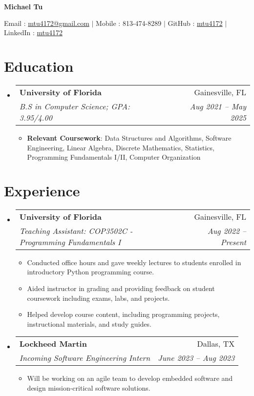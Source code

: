 \documentclass[letterpaper,11pt]{article}
\makeatletter
\newcommand{\resumeItem}[2]{
  \item\small{
    \textbf{#1}{: #2 \vspace{-2pt}}
  }
}
\newcommand{\resumeItemExperience}[1]{
  \item\small{
    {#1 \vspace{-2pt}}
  }
}
\newcommand{\resumeSubheading}[4]{
  \vspace{-1pt}\item
    \begin{tabular*}{0.97\textwidth}{l@{\extracolsep{\fill}}r}
      \textbf{#1} & #2 \\
      \textit{\small#3} & \textit{\small #4} \\
    \end{tabular*}\vspace{-6pt}
}
\newcommand{\resumeSubHeadingListStart}{\begin{itemize}[leftmargin=*, label={}]}
\newcommand{\resumeSubHeadingListEnd}{\end{itemize}}
\newcommand{\resumeItemListStart}{\begin{itemize}}
\newcommand{\resumeItemListEnd}{\end{itemize}\vspace{-5pt}}
\makeatother
\begin{document}
    \centerline{\textbf{\huge Michael Tu}}\vspace{0.15cm}
    \centerline{Email : \href{mailto:}{mtu4172@gmail.com} $|$
    Mobile : 813-474-8289 $|$
    GitHub : \href{http://github.com/mtu4172}{mtu4172} $|$
    LinkedIn : \href{http://linkedin.com/in/mtu4172}{mtu4172}}

\section{Education}
  \resumeSubHeadingListStart
    \resumeSubheading
      {University of Florida}{Gainesville, FL}
      {B.S in Computer Science; GPA: 3.95/4.00}{Aug 2021 -- May 2025}
    \resumeItemListStart
        \resumeItem{Relevant Coursework}
            {Data Structures and Algorithms, 
            Software Engineering, 
            Linear Algebra, 
            Discrete Mathematics, 
            Statistics, 
            Programming Fundamentals I/II, 
            Computer Organization
            }
    \resumeItemListEnd
  \resumeSubHeadingListEnd

\section{Experience}
  \resumeSubHeadingListStart
    \resumeSubheading
      {University of Florida}{Gainesville, FL}
      {Teaching Assistant: COP3502C - Programming Fundamentals I}{Aug 2022 -- Present}
      \resumeItemListStart
        \resumeItemExperience
          {Conducted office hours and gave weekly lectures to students enrolled in introductory Python programming course.}
        \resumeItemExperience
          {Aided instructor in grading and providing feedback on student coursework including exams, labs, and projects.}
        \resumeItemExperience
          {Helped develop course content, including programming projects, instructional materials, and study guides.}
        \resumeItemListEnd
      \resumeSubheading
      {Lockheed Martin}{Dallas, TX}
      {Incoming Software Engineering Intern}{June 2023 -- Aug 2023}
      \resumeItemListStart
        \resumeItemExperience
          {Will be working on an agile team to develop embedded software and design mission-critical software solutions.}
        \resumeItemListEnd
  \resumeSubHeadingListEnd

\end{document}

